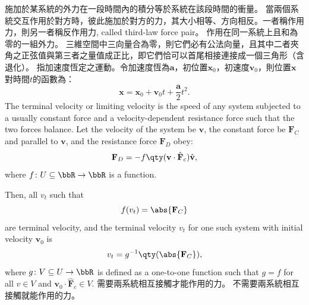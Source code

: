 \documentclass[a4paper,12pt]{article}
\begin{document}
施加於某系統的外力在一段時間內的積分等於系統在該段時間的衝量。
當兩個系統交互作用於對方時，彼此施加於對方的力，其大小相等、方向相反。一者稱作用力，則另一者稱反作用力, called third-law force pair。
作用在同一系統上且和為零的一組外力。
三維空間中三向量合為零，則它們必有公法向量，且其中二者夾角之正弦值與第三者之量值成正比，即它們恰可以首尾相接連接成一個三角形（含退化）。
指加速度恆定之運動。令加速度恆為$\mathbf{a}$，初位置$\mathbf{x}_0$，初速度$\mathbf{v}_0$，則位置$\mathbf{x}$對時間$t$的函數為：
\[\mathbf{x}=\mathbf{x}_0+\mathbf{v}_0t+\frac{\mathbf{a}}{2}t^2.\]
The terminal velocity or limiting velocity is the speed of any system subjected to a usually constant force and a velocity-dependent resistance force such that the two forces balance. Let the velocity of the system be $\mathbf{v}$, the constant force be $\mathbf{F}_C$ and parallel to $\mathbf{v}$, and the resistance force $\mathbf{F}_D$ obey:
\[\mathbf{F}_D=-f\qty(\mathbf{v}\cdot\hat{\mathbf{F}}_c)\hat{\mathbf{v}},\]
where $f\colon U\subseteq\bbR\to\bbR$ is a function.

Then, all $v_t$ such that
\[f(v_t)=\abs{\mathbf{F}_C}\]
are terminal velocity, and the terminal velocity $v_t$ for one such system with initial velocity $\mathbf{v}_0$ is
\[v_t=g^{-1}\qty(\abs{\mathbf{F}_C}),\]
where $g\colon V\subseteq U\to\bbR$ is defined as a one-to-one function such that $g=f$ for all $v\in V$ and $\mathbf{v}_0\cdot\hat{\mathbf{F}}_c\in V$.
需要兩系統相互接觸才能作用的力。
不需要兩系統相互接觸就能作用的力。
\end{document}

